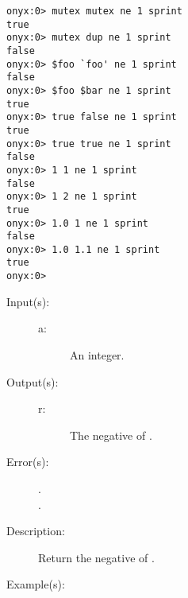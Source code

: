 \begin{description}
\begin{description}
\begin{verbatim}
onyx:0> mutex mutex ne 1 sprint
true
onyx:0> mutex dup ne 1 sprint
false
onyx:0> $foo `foo' ne 1 sprint
false
onyx:0> $foo $bar ne 1 sprint
true
onyx:0> true false ne 1 sprint
true
onyx:0> true true ne 1 sprint
false
onyx:0> 1 1 ne 1 sprint
false
onyx:0> 1 2 ne 1 sprint
true
onyx:0> 1.0 1 ne 1 sprint
false
onyx:0> 1.0 1.1 ne 1 sprint
true
onyx:0>
		\end{verbatim}
	\end{description}
\label{systemdict:neg}
\item[{\onyxop{a}{neg}{r}}: ]
	\begin{description}\item[]
	\item[Input(s): ]
		\begin{description}\item[]
		\item[a: ]
			An integer.
		\end{description}
	\item[Output(s): ]
		\begin{description}\item[]
		\item[r: ]
			The negative of .
		\end{description}
	\item[Error(s): ]
		\begin{description}\item[]
		\item[.]
		\item[.]
		\end{description}
	\item[Description: ]
		Return the negative of .
	\item[Example(s): ]\begin{verbatim}


\end{verbatim}
\end{description}
\end{description}
